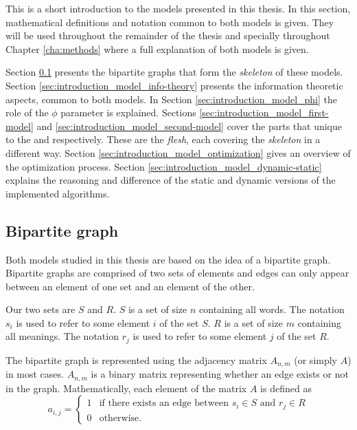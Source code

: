 This is a short introduction to the models presented in this thesis.
In this section, mathematical definitions and notation common to both models is given.
They will be used throughout the remainder of the thesis and specially throughout Chapter \ref{cha:methods} where a full explanation of both models is given.

Section \ref{sec:introduction_model_graph} presents the bipartite graphs that form the \emph{skeleton} of these models.
Section \ref{sec:introduction_model_info-theory} presents the information theoretic aspects, common to both models.
In Section \ref{sec:introduction_model_phi} the role of the $\phi$ parameter is explained.
Sections \ref{sec:introduction_model_first-model} and \ref{sec:introduction_model_second-model} cover the parts that unique to the \firstm{} and \secondmodel{} respectively. These are the \emph{flesh}, each covering the \emph{skeleton} in a different way.
Section \ref{sec:introduction_model_optimization} gives an overview of the optimization process.
Section \ref{sec:introduction_model_dynamic-static} explains the reasoning and difference of the static and dynamic versions of the implemented algorithms.

\subsection{Bipartite graph}
\label{sec:introduction_model_graph}

Both models studied in this thesis are based on the idea of a bipartite graph.
Bipartite graphs are comprised of two sets of elements and edges can only appear between an element of one set and an element of the other.

Our two sets are $S$ and $R$.
$S$ is a set of size $n$ containing all words.
The notation $s_i$ is used to refer to some element $i$ of the set $S$.
$R$ is a set of size $m$ containing all meanings.
The notation $r_j$ is used to refer to some element $j$ of the set $R$.

The bipartite graph is represented using the adjacency matrix $A_{n,m}$ (or simply $A$) in most cases.
$A_{n,m}$ is a \nbym{} binary matrix representing whether an edge exists or not in the graph.
Mathematically, each element of the matrix $A$ is defined as
\begin{equation*}
  a_{i,j} =
  \begin{cases}
    1 & \text{if there exists an edge between $s_i \in S$ and $r_j \in R$} \\
    0 & \text{otherwise.}
  \end{cases}
\end{equation*}

